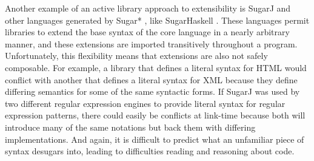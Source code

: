 Another example of an active library approach to extensibility is SugarJ \cite{erdweg2011sugarj} and other languages generated by Sugar* \cite{erdweg2013framework}, like SugarHaskell \cite{erdweg2012layout}. These languages permit libraries to extend the base syntax of the core language in a nearly arbitrary manner, and these extensions are imported transitively throughout a program. Unfortunately, this flexibility means that  extensions are also not safely composable. For example, a library that defines a literal syntax for HTML would conflict with another that defines a literal syntax for XML because they define differing semantics for some of the same syntactic forms. If SugarJ was used by two different regular expression engines to provide literal syntax for regular expression patterns, there could easily be conflicts at link-time because both will introduce many of the same notations but back them with differing implementations. 
And again, it is difficult to predict what an unfamiliar piece of syntax desugars into, leading to difficulties reading and reasoning about code.





